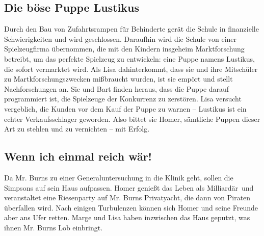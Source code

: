 \subsection{Die böse Puppe Lustikus}\label{BABF07}
Durch den Bau von Zufahrtsrampen für Behinderte gerät die Schule in finanzielle Schwierigkeiten und wird geschlossen. Daraufhin wird die Schule von einer Spielzeugfirma übernommen, die mit den Kindern insgeheim Marktforschung betreibt, um das perfekte Spielzeug zu entwickeln: eine Puppe namens Lustikus, die sofort vermarktet wird. Als Lisa dahinterkommt, dass sie und ihre Mitschüler zu Martkforschungszwecken mißbraucht wurden, ist sie empört und stellt Nachforschungen an. Sie und Bart finden heraus, dass die Puppe darauf programmiert ist, die Spielzeuge der Konkurrenz zu zerstören. Lisa versucht vergeblich, die Kunden vor dem Kauf der Puppe zu warnen -- Lustikus ist ein echter Verkaufsschlager geworden. Also bittet sie Homer, sämtliche Puppen dieser Art zu stehlen und zu vernichten -- mit Erfolg. 


	
\subsection{Wenn ich einmal reich wär!}\label{BABF08}
Da Mr. Burns zu einer Generaluntersuchung in die Klinik geht, sollen die Simpsons auf sein Haus aufpassen. Homer genießt das Leben als \glqq Milliardär\grqq\ und veranstaltet eine Riesenparty auf Mr. Burns Privatyacht, die dann von Piraten überfallen wird. Nach einigen Turbulenzen können sich Homer und seine Freunde aber ans Ufer retten. Marge und Lisa haben inzwischen das Haus geputzt, was ihnen Mr. Burns Lob einbringt.

